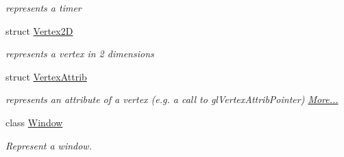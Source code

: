 \begin{DoxyCompactItemize}
\begin{DoxyCompactList}\small\item\em represents a timer \end{DoxyCompactList}\item 
struct \hyperlink{structnta_1_1Vertex2D}{Vertex2D}
\begin{DoxyCompactList}\small\item\em represents a vertex in 2 dimensions \end{DoxyCompactList}\item 
struct \hyperlink{namespacenta_df/d9d/structnta_1_1VertexAttrib}{Vertex\+Attrib}
\begin{DoxyCompactList}\small\item\em represents an attribute of a vertex (e.\+g. a call to gl\+Vertex\+Attrib\+Pointer)  \hyperlink{namespacenta_df/d9d/structnta_1_1VertexAttrib}{More...}\end{DoxyCompactList}\item 
class \hyperlink{classnta_1_1Window}{Window}
\begin{DoxyCompactList}\small\item\em Represent a window. \end{DoxyCompactList}\end{DoxyCompactItemize}
